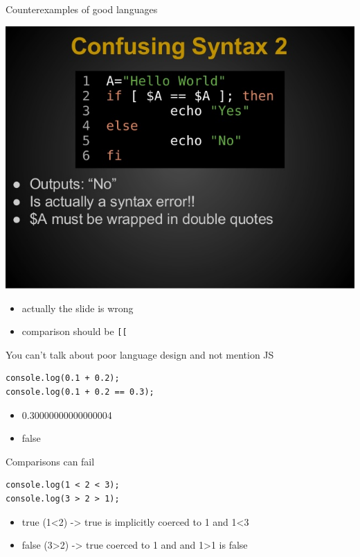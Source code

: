 \documentclass[presetation]{beamer}
\begin{document}
\begin{frame}[fragile,label={sec:org925eeac}]{Counterexamples of good languages}
 \begin{center}
\includegraphics[width=.6\linewidth]{./images/bashHorror.jpeg}
\end{center}
\pause
\begin{itemize}
\item actually the slide is wrong
\end{itemize}
\pause
\begin{itemize}
\item comparison should be \texttt{[[}
\end{itemize}
\end{frame}


\begin{frame}[fragile,label={sec:org0f7cb1e}]{You can't talk about poor language design and not mention JS}
 \begin{verbatim}
console.log(0.1 + 0.2);
console.log(0.1 + 0.2 == 0.3);
\end{verbatim}
\pause
\begin{itemize}
\item 0.30000000000000004
\item false
\end{itemize}
\end{frame}



\begin{frame}[fragile,label={sec:orgd740760}]{Comparisons can fail}
 \begin{verbatim}
console.log(1 < 2 < 3);
console.log(3 > 2 > 1);
\end{verbatim}
\pause
\begin{itemize}
\item true (1<2) -> true is implicitly coerced to 1 and 1<3
\item false (3>2) -> true coerced to 1 and and 1>1 is false
\end{itemize}
\end{frame}
\end{document}
